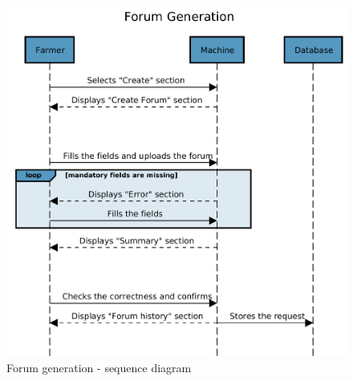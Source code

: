 \begin{figure}[H]
	\centering
    \includegraphics[page=1, width=\textwidth]{Images/SeqDiag/forum_generation_seq_diag.pdf}
	\caption{\label{fig:forum_generation_seq_diag}Forum generation - sequence diagram}
\end{figure}



